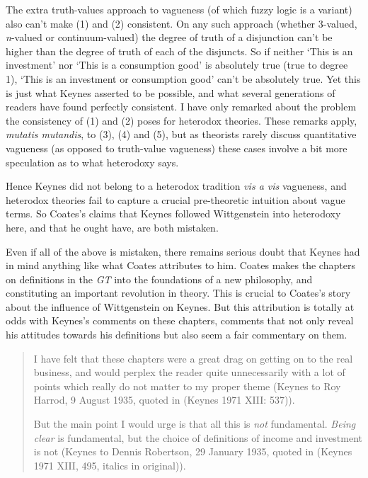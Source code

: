 \documentclass[noflushend]{philosophersimprint}
\begin{document}
The extra truth-values approach to vagueness (of which fuzzy logic is a
variant) also can't make (1) and (2) consistent. On any such approach
(whether 3-valued, \emph{n}-valued or continuum-valued) the degree of
truth of a disjunction can't be higher than the degree of truth of each
of the disjuncts. So if neither `This is an investment' nor `This is a
consumption good' is absolutely true (true to degree 1), `This is an
investment or consumption good' can't be absolutely true. Yet this is
just what Keynes asserted to be possible, and what several generations
of readers have found perfectly consistent. I have only remarked about
the problem the consistency of (1) and (2) poses for heterodox theories.
These remarks apply, \emph{mutatis mutandis}, to (3), (4) and (5), but
as theorists rarely discuss quantitative vagueness (as opposed to
truth-value vagueness) these cases involve a bit more speculation as to
what heterodoxy says.

Hence Keynes did not belong to a heterodox tradition \emph{vis a vis}
vagueness, and heterodox theories fail to capture a crucial
pre-theoretic intuition about vague terms. So Coates's claims that
Keynes followed Wittgenstein into heterodoxy here, and that he ought
have, are both mistaken.

Even if all of the above is mistaken, there remains serious doubt that
Keynes had in mind anything like what Coates attributes to him. Coates
makes the chapters on definitions in the \emph{GT} into the foundations
of a new philosophy, and constituting an important revolution in theory.
This is crucial to Coates's story about the influence of Wittgenstein on
Keynes. But this attribution is totally at odds with Keynes's comments
on these chapters, comments that not only reveal his attitudes towards
his definitions but also seem a fair commentary on them.

\begin{quote}
I have felt that these chapters were a great drag on getting on to the
real business, and would perplex the reader quite unnecessarily with a
lot of points which really do not matter to my proper theme (Keynes to
Roy Harrod, 9 August 1935, quoted in (Keynes 1971 XIII: 537)).

But the main point I would urge is that all this is \emph{not}
fundamental. \emph{Being clear} is fundamental, but the choice of
definitions of income and investment is not (Keynes to Dennis Robertson,
29 January 1935, quoted in (Keynes 1971 XIII, 495, italics in
original)).
\end{quote}
\end{document}

